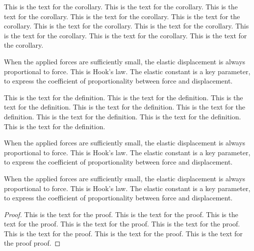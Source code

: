\begin{corollary}  %
This is the text for the corollary. This is the text for the
corollary. This is the text for the corollary. This is the text for
the corollary. This is the text for the corollary. This is the text
for the corollary. This is the text for the corollary. This is the
text for the corollary. This is the text for the corollary. This is
the text for the corollary.
\end{corollary}

When the applied forces are sufficiently small, the elastic 
displacement is always proportional to force. This is Hook's law. 
The elastic constant is a key parameter, to express the coefficient 
of proportionality between force and displacement.

\begin{definition}  %
This is the text for the definition. This is the text for the
definition. This is the text for the definition. This is the text for
the definition. This is the text for the definition. This is the text
for the definition. This is the text for the definition. This is the
text for the definition.
\end{definition}

When the applied forces are sufficiently small, the elastic 
displacement is always proportional to force. This is Hook's law.  
The elastic constant is a key parameter, to express the coefficient 
of proportionality between force and displacement.

When the applied forces are sufficiently small, the elastic 
displacement is always proportional to force. This is Hook's law. 
The elastic constant is a key parameter, to express the coefficient 
of proportionality between force and displacement.

\begin{proof}  %
This is the text for the proof. This is the text for the proof. This
is the text for the proof. This is the text for the proof. This is the
text for the proof. This is the text for the proof. This is the text
for the proof. This is the text for the proof proof.
\end{proof}

